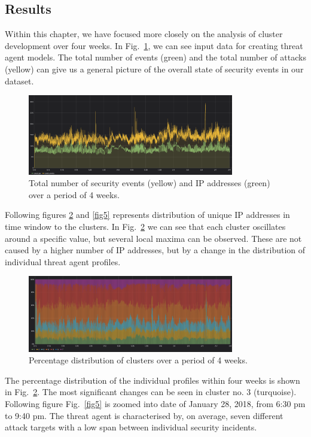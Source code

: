 \documentclass[conference, a4paper]{IEEEtran}
\begin{document}
\subsection{Results}
Within this chapter, we have focused more closely on the analysis of cluster development over four weeks. In Fig.~\ref{fig3}, we can see input data for creating threat agent models. The total number of events (green) and the total number of attacks (yellow) can give us a general picture of the overall state of security events in our dataset.

\begin{figure}[htbp]
\centerline{\includegraphics[width=9cm]{images/fig3.png}}
\caption{Total number of security events (yellow) and IP addresses (green) over a period of 4 weeks.} 
\label{fig3}
\end{figure}

Following figures \ref{fig4} and \ref{fig5} represents distribution of unique IP addresses in time window to the clusters. In Fig.~\ref{fig4} we can see that each cluster oscillates around a specific value, but several local maxima can be observed. These are not caused by a higher number of IP addresses, but by a change in the distribution of individual threat agent profiles.

\begin{figure}[htbp]
\centerline{\includegraphics[width=9cm]{images/fig4.png}}
\caption{Percentage distribution of clusters over a period of 4 weeks.} 
\label{fig4}
\end{figure}

The percentage distribution of the individual profiles within four weeks is shown in Fig.~\ref{fig4}. The most significant changes can be seen in cluster no. 3 (turquoise). Following figure Fig.~\ref{fig5} is zoomed into date of January 28, 2018, from 6:30 pm to 9:40 pm. The threat agent is characterised by, on average, seven different attack targets with a low span between individual security incidents.
\end{document}
